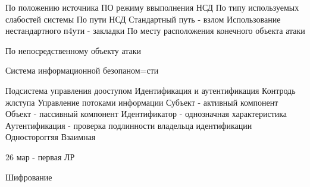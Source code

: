 \documentclass[a4paper,12pt]{report}
\begin{document}
	По положению источника
	ПО режиму ввыполнения НСД
	По типу используемых слабостей системы
	По пути НСД
		Стандартный путь - взлом
		Использование нестандартного п4ути - закладки
	По месту расположения конечного объекта атаки

	По непосредственному объекту атаки


	Система информационной безопаном=сти

	Подсистема управления дооступом
		Идентификация и аутентификация
		Контродь жлступа
		Управление потоками информации
	Субъект - активный компонент
	Объект - пассивный компонент
	Идентификатор - однозначная характеристика
	Аутентификация - проверка подлинности владельца идентификации
		Одностороггяя
		Взаимная

	26 мар - первая ЛР

	Шифрование



\end{document}
